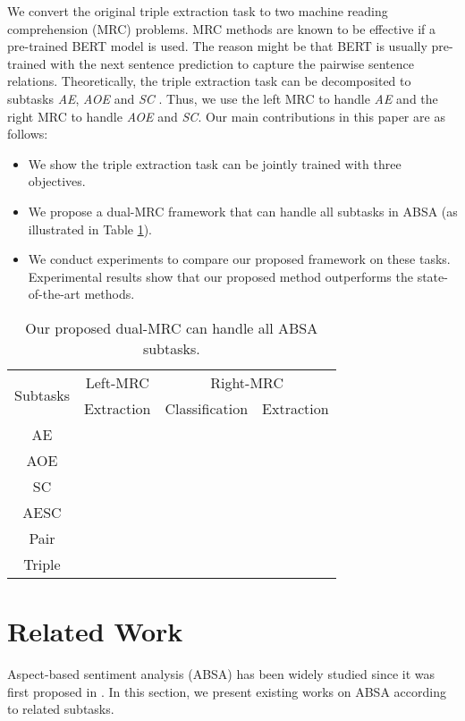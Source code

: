 \documentclass[letterpaper]{article} \usepackage{aaai21}  \usepackage{times}  \usepackage{helvet} \usepackage{courier}  \usepackage[hyphens]{url}  \usepackage{graphicx} \urlstyle{rm} \def\UrlFont{\rm}  \usepackage{natbib}  \usepackage{caption}
\begin{document}
We convert the original triple extraction task to two machine reading comprehension (MRC) problems.
MRC methods are known to be effective if a pre-trained BERT model is used. 
The reason might be that BERT is usually pre-trained with the next sentence prediction to capture the pairwise sentence relations.
Theoretically, the triple extraction task can be decomposited to subtasks \emph{AE}, \emph{AOE} and \emph{SC} .
Thus, we use the left MRC to handle \emph{AE} and the right MRC to handle \emph{AOE} and \emph{SC}. 
Our main contributions in this paper are as follows:
\begin{itemize}
    \item We show the triple extraction task can be jointly trained with three objectives.
    \item We propose a dual-MRC framework that can handle all subtasks in ABSA (as illustrated in Table \ref{subtasks}).
    \item We conduct experiments to compare our proposed framework on these tasks. Experimental results show that our proposed method outperforms the state-of-the-art methods. 
\end{itemize}
\begin{table}
    \centering
    \begin{tabular}{c|c|cc}
    \hline
    \multirow{2}{*}{Subtasks}  & Left-MRC & \multicolumn{2}{c}{Right-MRC}       \\ \cline{2-4} 
           & Extraction  & \multicolumn{1}{c|}{Classification} & Extraction \\ \hline
    AE     &    & \multicolumn{1}{c|}{}    &      \\ \hline
    AOE     &      & \multicolumn{1}{c|}{}    &    \\ \hline
    SC     &      & \multicolumn{1}{c|}{}   &      \\ \hline
    AESC   &    & \multicolumn{1}{c|}{}    &    \\ \hline
    Pair   &    & \multicolumn{1}{c|}{}    &    \\ \hline
    Triple &    & \multicolumn{1}{c|}{}   &    \\ \hline
    \end{tabular} 
    \caption{Our proposed dual-MRC can handle all ABSA subtasks.}
    \label{subtasks}
\end{table}




\section{Related Work}
Aspect-based sentiment analysis (ABSA) has been widely studied since it was first proposed in  \cite{kddHuL04}. In this section, we present existing works on ABSA according to related subtasks.
\end{document}
